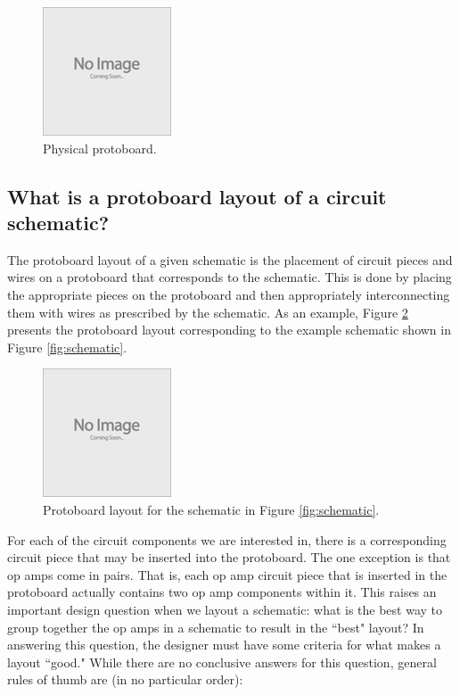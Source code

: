 \begin{figure}
\begin{center}
\includegraphics{Images/placeholder.jpg}
\caption{Physical protoboard.}
\label{fig:physical_protoboard}
\end{center}
\end{figure}

\subsection{What is a protoboard layout of a circuit schematic?}

The protoboard layout of a given schematic is the placement of circuit pieces
and wires on a protoboard that corresponds to the schematic. This is done by
placing the appropriate pieces on the protoboard and then appropriately
interconnecting them with wires as prescribed by the schematic. As an example,
Figure \ref{fig:eg_s_to_pb} presents the protoboard layout corresponding to the
example schematic shown in Figure \ref{fig:schematic}.

\begin{figure}
\begin{center}
\includegraphics{Images/placeholder.jpg}
\caption{Protoboard layout for the schematic in Figure \ref{fig:schematic}.}
\label{fig:eg_s_to_pb}
\end{center}
\end{figure}

For each of the circuit components we are interested in, there is a corresponding
circuit piece that may be inserted into the protoboard. The one exception is that
op amps come in pairs. That is, each op amp circuit piece that is inserted in the
protoboard actually contains two op amp components within it. This raises an
important design question when we layout a schematic: what is the best way to
group together the op amps in a schematic to result in the ``best" layout? In
answering this question, the designer must have some criteria for what makes a
layout ``good." While there are no conclusive answers for this question,
general rules of thumb are (in no particular order):


